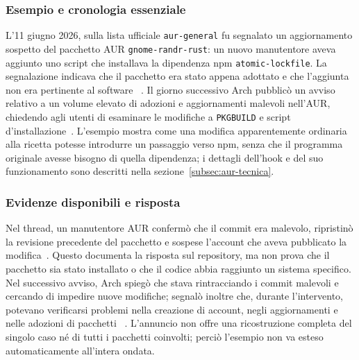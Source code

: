 \subsubsection{Esempio e cronologia essenziale}
L'11 giugno 2026, sulla lista ufficiale \texttt{aur-general} fu segnalato un
aggiornamento sospetto del pacchetto AUR \texttt{gnome-randr-rust}: un nuovo
manutentore aveva aggiunto uno script che installava la dipendenza npm
\texttt{atomic-lockfile}. La segnalazione indicava che il pacchetto era stato
appena adottato e che l'aggiunta non era pertinente al software
~\cite{aur-mail-gnome-randr,aur-video-2026}. Il giorno successivo Arch pubblicò un avviso
relativo a un volume elevato di adozioni e aggiornamenti malevoli nell'AUR,
chiedendo agli utenti di esaminare le modifiche a \texttt{PKGBUILD} e script
d'installazione~\cite{arch-aur-incident-2026}. L'esempio mostra come una
modifica apparentemente ordinaria alla ricetta potesse introdurre un passaggio
verso npm, senza che il programma originale avesse bisogno di quella
dipendenza; i dettagli dell'hook e del suo funzionamento sono descritti nella
sezione~\ref{subsec:aur-tecnica}.

\subsubsection{Evidenze disponibili e risposta}
Nel thread, un manutentore AUR confermò che il commit era malevolo, ripristinò
la revisione precedente del pacchetto e sospese l'account che aveva pubblicato
la modifica~\cite{aur-mail-gnome-randr}. Questo documenta la risposta sul
repository, ma non prova che il pacchetto sia stato installato o che il codice
abbia raggiunto un sistema specifico. Nel successivo avviso, Arch spiegò che
stava rintracciando i commit malevoli e cercando di impedire nuove modifiche;
segnalò inoltre che, durante l'intervento, potevano verificarsi problemi nella
creazione di account, negli aggiornamenti e nelle adozioni di pacchetti
~\cite{arch-aur-incident-2026}. L'annuncio non offre una ricostruzione completa
del singolo caso né di tutti i pacchetti coinvolti; perciò l'esempio non va
esteso automaticamente all'intera ondata.

